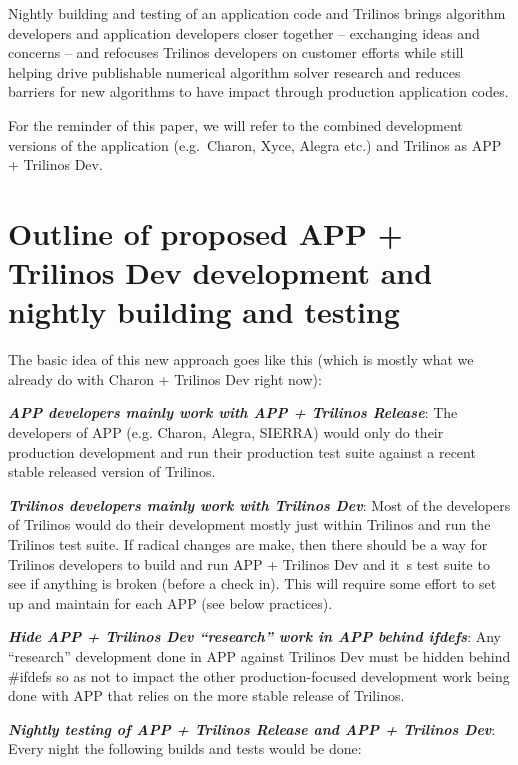 \documentclass[pdf,ps2pdf,11pt]{SANDreport}
\begin{document}
Nightly building and testing of an application code and Trilinos
brings algorithm developers and application developers closer together --
exchanging ideas and concerns -- and refocuses Trilinos developers on customer 
efforts while still helping drive publishable numerical algorithm solver
research and reduces barriers for new algorithms to have impact through
production application codes.

For the reminder of this paper, we will refer to the combined development
versions of the application (e.g.\ Charon, Xyce, Alegra etc.) and Trilinos as
APP + Trilinos Dev.


%
{}\section{Outline of proposed APP + Trilinos Dev development and nightly
building and testing}
%

The basic idea of this new approach goes like this (which is mostly what we
already do with Charon + Trilinos Dev right now):

{}\textit{\textbf{APP developers mainly work with APP + Trilinos Release}}: The
developers of APP (e.g. Charon, Alegra, SIERRA) would only do their production
development and run their production test suite against a recent stable
released version of Trilinos.

{}\textit{\textbf{Trilinos developers mainly work with Trilinos Dev}}: Most of the
developers of Trilinos would do their development mostly just within Trilinos
and run the Trilinos test suite.  If radical changes are make, then there
should be a way for Trilinos developers to build and run APP + Trilinos Dev
and it~s test suite to see if anything is broken (before a check in).  This
will require some effort to set up and maintain for each APP (see below
practices).

{}\textit{\textbf{Hide APP + Trilinos Dev ``research'' work in APP behind
ifdefs}}: Any ``research'' development done in APP against Trilinos Dev must be
hidden behind {}\#ifdefs so as not to impact the other production-focused
development work being done with APP that relies on the more stable release of
Trilinos.

{}\textit{\textbf{Nightly testing of APP + Trilinos Release and APP + Trilinos
Dev}}: Every night the following builds and tests would be done:
\end{document}
